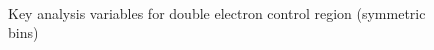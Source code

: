 \begin{figure}
\begin{center}
         \\
        \caption{Key analysis variables for double electron control region (symmetric bins)}
        \label{fig:distribution_doubleele_sym}
    \end{center}
\end{figure}

